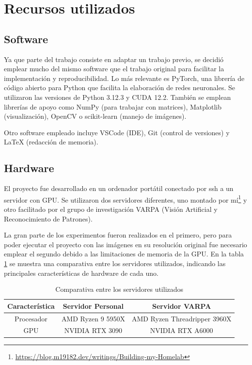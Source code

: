 \section{Recursos utilizados}
\label{sec:Recursos utilizados}

\subsection{Software}
\label{subsec:Software}

Ya que parte del trabajo consiste en adaptar un trabajo previo,
se decidió emplear mucho del mismo software que el trabajo original para facilitar la implementación y reproducibilidad.
Lo más relevante es PyTorch, una librería de código abierto para Python que facilita la elaboración de redes neuronales. Se utilizaron las versiones de Python 3.12.3 y CUDA 12.2. También se emplean librerías de apoyo como NumPy (para trabajar con matrices), Matplotlib (visualización), OpenCV o scikit-learn (manejo de imágenes).

Otro software empleado incluye VSCode (IDE), Git (control de versiones) y LaTeX (redacción de memoria).

\subsection{Hardware}
\label{subsec:Hardware}

El proyecto fue desarrollado en un ordenador portátil conectado por ssh a un servidor con GPU.
Se utilizaron dos servidores diferentes, uno montado por mí\footnote{\url{https://blog.m19182.dev/writings/Building-my-Homelab}} y otro facilitado por el grupo de investigación VARPA (Visión Artificial y Reconocimiento de Patrones).

La gran parte de los experimentos fueron realizados en el primero, pero para poder ejecutar el proyecto con las imágenes en su resolución original fue necesario emplear el segundo
debido a las limitaciones de memoria de la GPU. En la tabla \ref{tab:comparativa_servidores} se muestra una comparativa entre los servidores utilizados, indicando las principales características de hardware de cada uno.

\begin{table}[tbp]
\centering
\begin{tabular}{|c|c|c|}
\hline
\textbf{Característica} & \textbf{Servidor Personal} & \textbf{Servidor VARPA} \\ \hline
Procesador & AMD Ryzen 9 5950X&  AMD Ryzen Threadripper 3960X \\ \hline
GPU & NVIDIA RTX 3090 & NVIDIA RTX A6000  \\ \hline
\end{tabular}
\caption{Comparativa entre los servidores utilizados}
\label{tab:comparativa_servidores}
\end{table}


